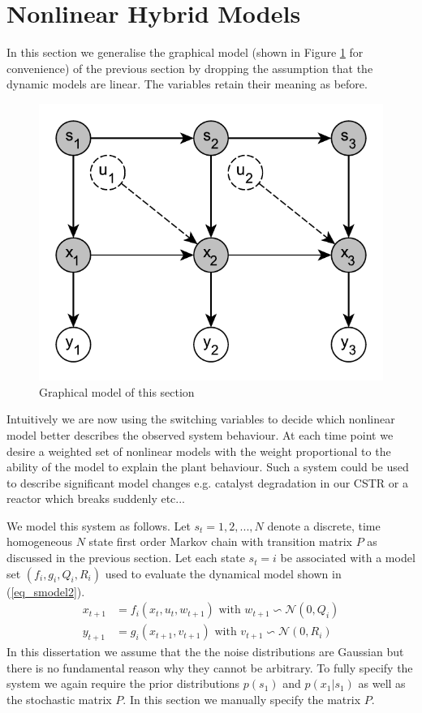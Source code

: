 \documentclass[../masters.tex]{subfiles}
\begin{document}
\graphicspath{{./imgs/}{../imgs/}} %

\section{Nonlinear Hybrid Models}
In this section we generalise the graphical model (shown in Figure \ref{fig_hybridmod2} for convenience) of the previous section by dropping the assumption that the dynamic models are linear. The variables retain their meaning as before.     
\begin{figure}[H] 
\centering
\includegraphics[scale=1.0]{hybrid_model.pdf}
\caption{Graphical model of this section}
\label{fig_hybridmod2}
\end{figure}
Intuitively we are now using the switching variables to decide which nonlinear model better describes the observed system behaviour. At each time point we desire a weighted set of nonlinear models with the weight proportional to the ability of the model to explain the plant behaviour. Such a system could be used to describe significant model changes e.g. catalyst degradation in our CSTR or a reactor which breaks suddenly etc... 

We model this system as follows. Let $s_t=1,2,..., N$ denote a discrete, time homogeneous $N$ state first order Markov chain with transition matrix $P$ as discussed in the previous section. Let each state $s_t=i$ be associated with a model set $\left(f_i, g_i, Q_i, R_i \right)$ used to evaluate the dynamical model shown in (\ref{eq_smodel2}).
\begin{equation}
\begin{aligned}
x_{t+1} &= f_i(x_t, u_t, w_{t+1}) \text{ with } w_{t+1} \backsim \mathcal{N}(0, Q_i)\\
y_{t+1} &= g_i(x_{t+1}, v_{t+1}) \text{ with } v_{t+1} \backsim \mathcal{N}(0,R_i)
\end{aligned}
\label{eq_smodel2}
\end{equation}
In this dissertation we assume that the the noise distributions are Gaussian but there is no fundamental reason why they cannot be arbitrary. To fully specify the system we again require the prior distributions $p(s_1)$ and $p(x_1|s_1)$ as well as the stochastic matrix $P$. In this section we manually specify the matrix $P$. 
\end{document}
